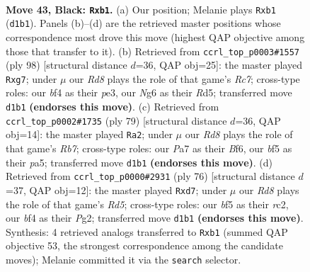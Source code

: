\documentclass[11pt]{article}
\begin{document}
\clearpage

\begin{figure}[p]\centering
\begin{subfigure}{0.46\textwidth}\centering
\resizebox{\linewidth}{!}{%
\newchessgame
\chessboard[
  setfen={8/p6k/Pp4n1/5B2/4pB2/6K1/8/1R1r4 b - - 0 43},
  showmover=false,
  pgfstyle=straightmove, color=movearrow, markmove={d1-b1}
]}
\caption{}
\end{subfigure}\hfill
\begin{subfigure}{0.46\textwidth}\centering
\resizebox{\linewidth}{!}{%
\newchessgame
\chessboard[
  setfen={8/2R3rp/4bk2/3R4/8/4p2P/6PK/8 w - - 1 50},
  showmover=false,
  pgfstyle=straightmove, color=movearrow, markmove={c7-g7}
]}
\caption{}
\end{subfigure}
\\[4pt]
\begin{subfigure}{0.46\textwidth}\centering
\resizebox{\linewidth}{!}{%
\newchessgame
\chessboard[
  setfen={4k3/1R6/2K2bp1/P3p3/6p1/6B1/1r5P/8 b - - 2 40},
  showmover=false,
  pgfstyle=straightmove, color=movearrow, markmove={b2-a2}
]}
\caption{}
\end{subfigure}\hfill
\begin{subfigure}{0.46\textwidth}\centering
\resizebox{\linewidth}{!}{%
\newchessgame
\chessboard[
  setfen={5bk1/3b1p2/8/p2R4/P5P1/6N1/2r2PP1/6K1 w - - 0 39},
  showmover=false,
  pgfstyle=straightmove, color=movearrow, markmove={d5-d7}
]}
\caption{}
\end{subfigure}
\caption{\textbf{Move 43, Black: \texttt{Rxb1}.} (a) Our position; Melanie plays \texttt{Rxb1} (\texttt{d1b1}). Panels (b)--(d) are the retrieved master positions whose correspondence most drove this move (highest QAP objective among those that transfer to it). (b) Retrieved from \texttt{ccrl\_top\_p0003\#1557} (ply 98) [structural distance $d$=36, QAP obj=25]: the master played \texttt{Rxg7}; under $\mu$ our \emph{Rd8} plays the role of that game's \emph{Rc7}; cross-type roles: our \emph{b}f4 as their \emph{p}e3, our \emph{N}g6 as their \emph{R}d5; transferred move \texttt{d1b1} \textbf{(endorses this move)}. (c) Retrieved from \texttt{ccrl\_top\_p0002\#1735} (ply 79) [structural distance $d$=36, QAP obj=14]: the master played \texttt{Ra2}; under $\mu$ our \emph{Rd8} plays the role of that game's \emph{Rb7}; cross-type roles: our \emph{P}a7 as their \emph{B}f6, our \emph{b}f5 as their \emph{p}a5; transferred move \texttt{d1b1} \textbf{(endorses this move)}. (d) Retrieved from \texttt{ccrl\_top\_p0000\#2931} (ply 76) [structural distance $d$=37, QAP obj=12]: the master played \texttt{Rxd7}; under $\mu$ our \emph{Rd8} plays the role of that game's \emph{Rd5}; cross-type roles: our \emph{b}f5 as their \emph{r}c2, our \emph{b}f4 as their \emph{P}g2; transferred move \texttt{d1b1} \textbf{(endorses this move)}. Synthesis: 4 retrieved analogs transferred to \texttt{Rxb1} (summed QAP objective 53, the strongest correspondence among the candidate moves); Melanie committed it via the \texttt{search} selector.}
\label{fig:thought-m85}
\end{figure}
\end{document}

